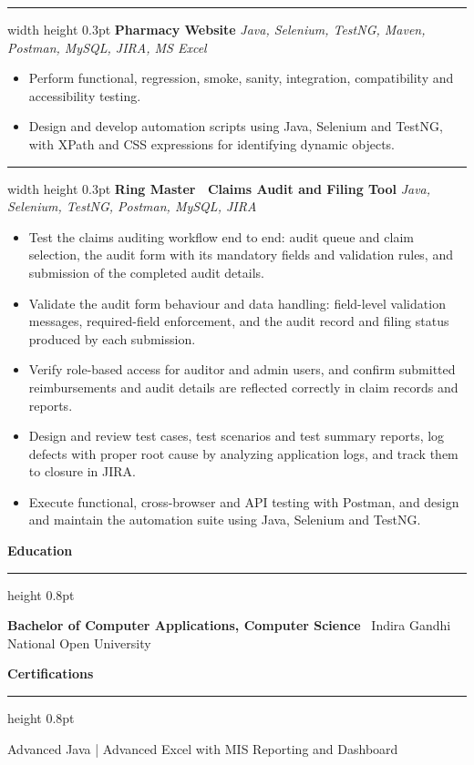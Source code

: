 \documentclass[10pt,a4paper]{article}
\newcommand{\sectionheader}[1]{%
    \vspace{4pt}
    {\normalsize\bfseries #1}
    \vspace{1pt}
    \hrule height 0.8pt
    \vspace{3pt}
}
\newcommand{\entrysep}{\vspace{3pt}\hrule width \hsize height 0.3pt\vspace{5pt}}
\begin{document}
\entrysep
\textbf{Pharmacy Website} \hfill \textit{Java, Selenium, TestNG, Maven, Postman, MySQL, JIRA, MS Excel}

\begin{itemize}
    \item Perform functional, regression, smoke, sanity, integration, compatibility and accessibility testing.
    \item Design and develop automation scripts using Java, Selenium and TestNG, with XPath and CSS expressions for identifying dynamic objects.
\end{itemize}

\entrysep
\textbf{Ring Master \textendash\ Claims Audit and Filing Tool} \hfill \textit{Java, Selenium, TestNG, Postman, MySQL, JIRA}

\begin{itemize}
    \item Test the claims auditing workflow end to end: audit queue and claim selection, the audit form with its mandatory fields and validation rules, and submission of the completed audit details.
    \item Validate the audit form behaviour and data handling: field-level validation messages, required-field enforcement, and the audit record and filing status produced by each submission.
    \item Verify role-based access for auditor and admin users, and confirm submitted reimbursements and audit details are reflected correctly in claim records and reports.
    \item Design and review test cases, test scenarios and test summary reports, log defects with proper root cause by analyzing application logs, and track them to closure in JIRA.
    \item Execute functional, cross-browser and API testing with Postman, and design and maintain the automation suite using Java, Selenium and TestNG.
\end{itemize}


\sectionheader{Education}

\textbf{Bachelor of Computer Applications, Computer Science} \textendash\ Indira Gandhi National Open University


\sectionheader{Certifications}

Advanced Java | Advanced Excel with MIS Reporting and Dashboard
\end{document}
